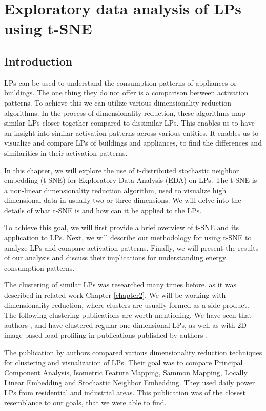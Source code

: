 \chapter{Exploratory data analysis of LPs using t-SNE} 

\label{chapter5} 

\section{Introduction}

LPs can be used to understand the consumption patterns of appliances or buildings.
The one thing they do not offer is a comparison between activation patterns.
To achieve this we can utilize various dimensionality reduction algorithms. 
In the process of dimensionality reduction, these algorithms map similar LPs closer together compared to dissimilar LPs.
This enables us to have an insight into similar activation patterns across various entities.
It enables us to visualize and compare LPs of buildings and appliances, to find the differences and similarities in their activation patterns.

In this chapter, we will explore the use of t-distributed stochastic neighbor embedding (t-SNE) for Exploratory Data Analysis (EDA) on LPs.
The t-SNE is a non-linear dimensionality reduction algorithm, used to visualize high dimensional data in usually two or three dimensions.
We will delve into the details of what t-SNE is and how can it be applied to the LPs.

To achieve this goal, we will first provide a brief overview of t-SNE and its application to LPs.
Next, we will describe our methodology for using t-SNE to analyze LPs and compare activation patterns.
Finally, we will present the results of our analysis and discuss their implications for understanding energy consumption patterns.

The clustering of similar LPs was researched many times before, as it was described in related work Chapter \ref{chapter2}.
We will be working with dimensionality reduction, where clusters are usually formed as a side product.
The following clustering publications are worth mentioning.
We have seen that authors \cite{GERBEC2005}, \cite{Jeong2021} and \cite{Joana2012} have clustered regular one-dimensional LPs, as well as with 2D image-based load profiling in publications published by authors \cite{Park2019}. 

The publication by authors \cite{sne_energ} compared various dimensionality reduction techniques for clustering and visualization of LPs.
Their goal was to compare Principal Component Analysis, Isometric Feature Mapping, Sammon Mapping, Locally Linear Embedding and Stochastic Neighbor Embedding.
They used daily power LPs from residential and industrial areas.
This publication was of the closest resemblance to our goals, that we were able to find. 


